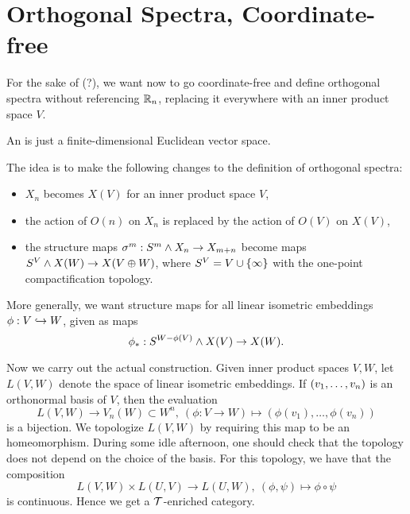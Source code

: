 
\section{Orthogonal Spectra, Coordinate-free}


For the sake of (?), we want now to go coordinate-free and define orthogonal spectra without referencing ${\mathbb R}_n$, replacing it everywhere with an inner product space $V$.

\begin{definition}
An  is just a finite-dimensional Euclidean vector space.
\end{definition}

\noindent
The idea is to make the following changes to the definition of orthogonal spectra:
\begin{itemize}
    \item $X_n$ becomes $X(V)$ for an inner product space $V$,
    \item the action of $O(n)$ on $X_n$ is replaced by the action of $O(V)$ on $X(V)$,
    \item the structure maps $\sigma^m:S^m\wedge X_n\to X_{m+n}$ become maps $S^V\wedge X(W)\to X(V\oplus W)$, where $S^V=V\cup\{\infty\}$ with the one-point compactification topology.
\end{itemize}
More generally, we want structure maps for all linear isometric embeddings $\phi:V\into W$, given as maps
\[\phi_*:S^{W-\phi(V)}\smsh X(V)\to X(W).\]

Now we carry out the actual construction. Given inner product spaces $V,W$, let $L(V,W)$ denote the space of linear isometric embeddings. If $({{v}_1,\dots,{v}_{n}})$ is an orthonormal basis of $V$, then the evaluation
\[L(V,W)\to V_n(W)\subset W^n,\ (\phi:V\to W)\mapsto(\phi(v_1),\dots,\phi(v_n))\]
is a bijection. We topologize $L(V,W)$ by requiring this map to be an homeomorphism. During some idle afternoon, one should check that the topology does not depend on the choice of the basis. For this topology, we have that the composition
\[L(V,W)\times L(U,V)\to L(U,W),\ (\phi,\psi)\mapsto\phi\circ\psi\]
is continuous. Hence we get a $\mathcal{T}$-enriched category.

